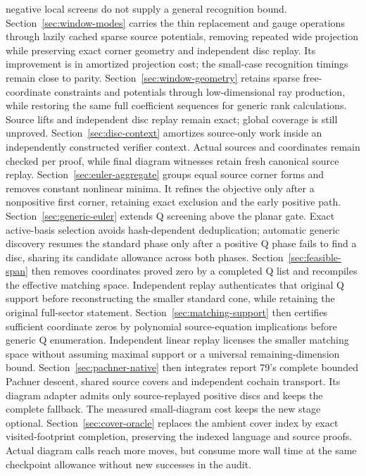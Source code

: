 \documentclass[11pt]{article}
\theoremstyle{remark}
\begin{document}
negative local screens do not supply a general recognition bound.
Section~\ref{sec:window-modes} carries the thin replacement and gauge
operations through lazily cached sparse source potentials, removing
repeated wide projection while preserving exact corner geometry and
independent disc replay. Its improvement is in amortized projection cost;
the small-case recognition timings remain close to parity.
Section~\ref{sec:window-geometry} retains sparse free-coordinate constraints
and potentials through low-dimensional ray production, while restoring the
same full coefficient sequences for generic rank calculations. Source lifts
and independent disc replay remain exact; global coverage is still unproved.
Section~\ref{sec:disc-context} amortizes source-only work inside an independently
constructed verifier context. Actual sources and coordinates remain checked
per proof, while final diagram witnesses retain fresh canonical source replay.
Section~\ref{sec:euler-aggregate} groups equal source corner forms and
removes constant nonlinear minima. It refines the objective only after a
nonpositive first corner, retaining exact exclusion and the early positive path.
Section~\ref{sec:generic-euler} extends Q screening above the planar gate.
Exact active-basis selection avoids hash-dependent deduplication; automatic
generic discovery resumes the standard phase only after a positive Q phase
fails to find a disc, sharing its candidate allowance across both phases.
Section~\ref{sec:feasible-span} then removes coordinates proved zero by
a completed Q list and recompiles the effective matching space. Independent
replay authenticates that original Q support before reconstructing the
smaller standard cone, while retaining the original full-sector statement.
Section~\ref{sec:matching-support} then certifies sufficient coordinate
zeros by polynomial source-equation implications before generic Q enumeration.
Independent linear replay licenses the smaller matching space without
assuming maximal support or a universal remaining-dimension bound.
Section~\ref{sec:pachner-native} then integrates report 79's complete bounded
Pachner descent, shared source covers and independent cochain transport.
Its diagram adapter admits only source-replayed positive discs and keeps the
complete fallback. The measured small-diagram cost keeps the new stage optional.
Section~\ref{sec:cover-oracle} replaces the ambient cover index by exact
visited-footprint completion, preserving the indexed language and source
proofs. Actual diagram calls reach more moves, but consume more wall time
at the same checkpoint allowance without new successes in the audit.
\end{document}
